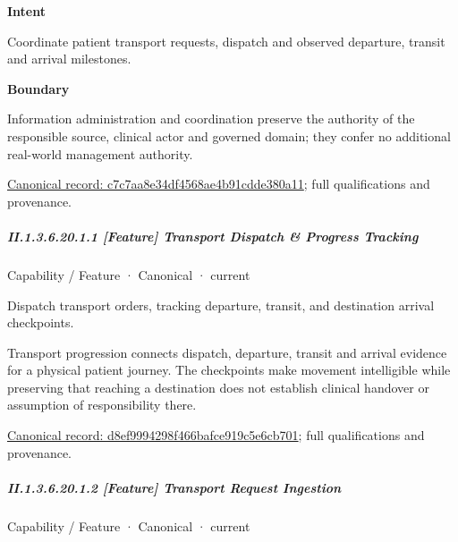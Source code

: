 \textbf{Intent}



Coordinate patient transport requests, dispatch and observed departure, transit and arrival milestones.



\textbf{Boundary}



Information administration and coordination preserve the authority of the responsible source, clinical actor and governed domain; they confer no additional real-world management authority.


{\footnotesize \href{../../../../../../../continuum/strategy/capability/c7c7aa8e34df4568ae4b91cdde380a11.md}{Canonical record: c7c7aa8e34df4568ae4b91cdde380a11}; full qualifications and provenance.}\par
\subparagraph*{II.1.3.6.20.1.1 [Feature] Transport Dispatch \& Progress Tracking}
\label{navigation:II.1.3.6.20.1.1}

\label{element:d8ef9994298f466bafce919c5e6cb701}
{\small Capability / Feature · Canonical · current}\par

Dispatch transport orders, tracking departure, transit, and destination arrival checkpoints.



Transport progression connects dispatch, departure, transit and arrival evidence for a physical patient journey. The checkpoints make movement intelligible while preserving that reaching a destination does not establish clinical handover or assumption of responsibility there.


{\footnotesize \href{../../../../../../../continuum/strategy/capability/feature/d8ef9994298f466bafce919c5e6cb701.md}{Canonical record: d8ef9994298f466bafce919c5e6cb701}; full qualifications and provenance.}\par
\subparagraph*{II.1.3.6.20.1.2 [Feature] Transport Request Ingestion}
\label{navigation:II.1.3.6.20.1.2}

\label{element:7104472d065840eb91ae4cb7a3a0cb43}
{\small Capability / Feature · Canonical · current}\par

